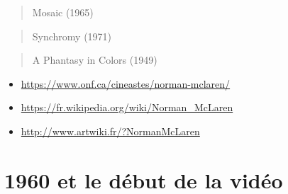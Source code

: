 \documentclass[
]{book}
\providecommand{\tightlist}{%
  \setlength{\itemsep}{0pt}\setlength{\parskip}{0pt}}
\begin{document}
\begin{quote}
Mosaic (1965)
\end{quote}

\begin{quote}
Synchromy (1971)
\end{quote}

\begin{quote}
A Phantasy in Colors (1949)
\end{quote}

\begin{itemize}
\tightlist
\item
  \url{https://www.onf.ca/cineastes/norman-mclaren/}
\item
  \url{https://fr.wikipedia.org/wiki/Norman_McLaren}
\item
  \url{http://www.artwiki.fr/?NormanMcLaren}
\end{itemize}

\hypertarget{et-le-duxe9but-de-la-viduxe9o}{%
\section{1960 et le début de la vidéo}\label{et-le-duxe9but-de-la-viduxe9o}}
\end{document}
